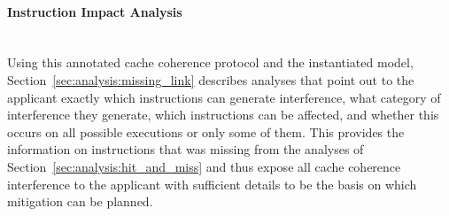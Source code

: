 \paragraph{Instruction Impact Analysis}~~\\
Using this annotated cache coherence protocol and the instantiated model,
Section~\ref{sec:analysis:missing_link} describes analyses that point out to
the applicant exactly which instructions can generate interference, what
category of interference they generate, which instructions can be affected, and
whether this occurs on all possible executions or only some of them. This
provides the information on instructions that was missing from the
analyses of Section~\ref{sec:analysis:hit_and_miss} and thus expose all cache
coherence interference to the applicant with sufficient details to be the basis
on which mitigation can be planned.

